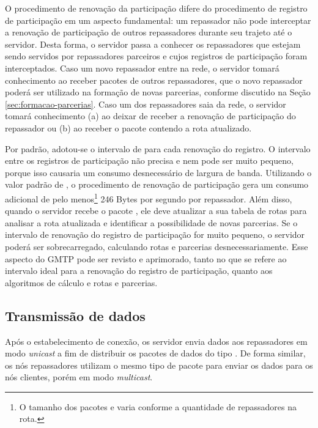 O procedimento de renovação da participação difere do procedimento de registro de participação em um aspecto fundamental: um repassador não pode interceptar a renovação de participação de outros repassadores durante seu trajeto até o servidor.
Desta forma, o servidor passa a conhecer os repassadores que estejam sendo servidos por repassadores parceiros e cujos registros de participação foram interceptados. 
Caso um novo repassador entre na rede, o servidor tomará conhecimento ao receber pacotes  de outros repassadores, que o novo repassador poderá ser utilizado na formação de novas parcerias, conforme discutido na Seção \ref{sec:formacao-parcerias}.
Caso um dos repassadores saia da rede, o servidor tomará conhecimento (a) ao deixar de receber a renovação de participação do repassador ou (b) ao receber o pacote  contendo a rota atualizado.

Por padrão, adotou-se o intervalo de  para cada renovação do registro. 
O intervalo entre os registros de participação não precisa e nem pode ser muito pequeno, porque isso causaria um consumo desnecessário de largura de banda. 
Utilizando o valor padrão de , o procedimento de renovação de participação gera um consumo adicional de pelo menos\footnote{O tamanho dos pacotes  e  varia conforme a quantidade de repassadores na rota.} 246 Bytes por segundo por repassador.
Além disso, quando o servidor recebe o pacote , ele deve atualizar a sua tabela de rotas para analisar a rota atualizada e identificar a possibilidade de novas parcerias.
Se o intervalo de renovação do registro de participação for muito pequeno, o servidor poderá ser sobrecarregado, calculando rotas e parcerias desnecessariamente.
Esse aspecto do GMTP pode ser revisto e aprimorado, tanto no que se refere ao intervalo ideal para a renovação do registro de participação, quanto aos algoritmos de cálculo e rotas e parcerias.

\subsection{Transmissão de dados}

Após o estabelecimento de conexão, os servidor envia dados aos repassadores em modo \textit{unicast} a fim de distribuir os pacotes de dados do tipo . 
De forma similar, os nós repassadores utilizam o mesmo tipo de pacote para enviar os dados para os nós clientes, porém em modo \textit{multicast}.

